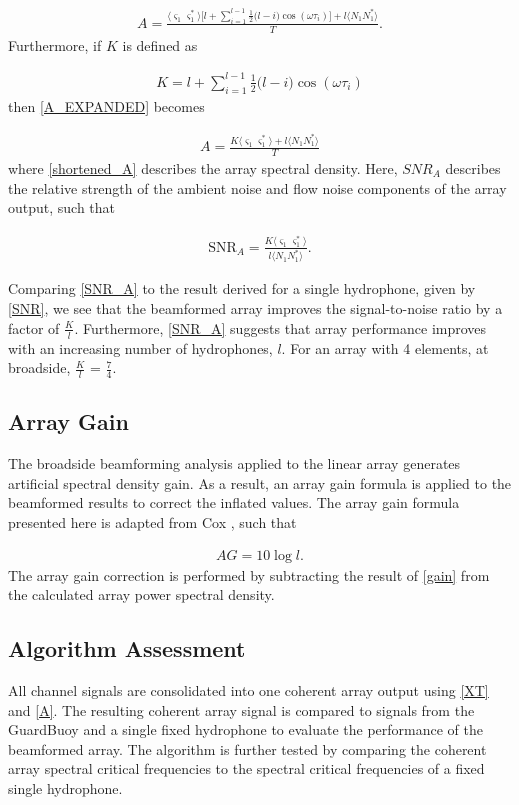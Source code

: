 \documentclass[12pt,journal,onecolumn]{IEEEtran}
\begin{document}
\begin{align}
A = \frac{\langle \varsigma_1\varsigma^*_1 \rangle \Big [ l + \sum \limits_{i=1}^{l-1}\frac{1}{2}\Big (l - i \Big )\cos(\omega \tau_{i}) \Big ] + l\langle N_1 N^*_1 \rangle }{T}.
\label{A_EXPANDED}
\end{align}
Furthermore, if $K$ is defined as

\begin{align}
K =  l + \sum_{i=1}^{l-1}\frac{1}{2}\Big (l - i \Big )\cos(\omega \tau_{i}) 
\label{shortened}
\end{align}
then \eqref{A_EXPANDED} becomes

\begin{align}
A = \frac{K\langle  \varsigma_1 \varsigma^*_1 \rangle  + l\langle N_1 N^*_1 \rangle}{T}
\label{shortened_A}
\end{align}
where \eqref{shortened_A} describes the array spectral density. Here, $SNR_A$ describes the relative strength of the ambient noise and flow noise components of the array output, such that

\begin{align}
\text{SNR}_A = \frac{K  \langle \varsigma_1 \varsigma^*_1 \rangle}{l\langle N_1 N^*_1 \rangle}.
\label{SNR_A}
\end{align}

Comparing \eqref{SNR_A} to the result derived for a single hydrophone, given by \eqref{SNR}, we see that the beamformed array improves the signal-to-noise ratio by a factor of $\frac{K}{l}$. Furthermore, \eqref{SNR_A} suggests that array performance improves with an increasing number of hydrophones, $l$. For an array with 4 elements, at broadside, $\frac{K}{l}$ = $\frac{7}{4}$.



\subsection{Array Gain}
The broadside beamforming analysis applied to the linear array generates artificial spectral density gain. As a result, an array gain formula is applied to the beamformed results to correct the inflated values. The array gain formula presented here is adapted from Cox \cite{cox}, such that

\begin{align}
AG = 10 \log l.
\label{gain}
\end{align}
The array gain correction is performed by subtracting the result of \eqref{gain} from the calculated array power spectral density.
\subsection{Algorithm Assessment}
All channel signals are consolidated into one coherent array output using \eqref{XT} and \eqref{A}. The resulting coherent array signal is compared to signals from the GuardBuoy and a single fixed hydrophone to evaluate the performance of the beamformed array. The algorithm is further tested by comparing the coherent array spectral critical frequencies  to the spectral critical frequencies of a fixed single hydrophone. 
\end{document}
